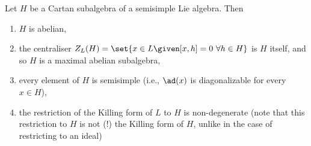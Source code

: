 Let $H$ be a Cartan subalgebra of a semisimple Lie algebra. Then
\begin{enumerate}[label=(\alph*)]
	\item $H$ is abelian,
	\item the centraliser $Z_L(H) = \set{x \in L\given [x, h] = 0~\forall h \in H}$
		is $H$ itself, and so $H$ is a maximal abelian subalgebra,
	\item every element of $H$ is semisimple (i.e., $\ad(x)$ is diagonalizable for
		every $x \in H$),
	\item the restriction of the Killing form of $L$ to $H$ is non-degenerate
		(note that this restriction to $H$ is not (!) the Killing form of $H$, unlike
		in the case of restricting to an ideal)
\end{enumerate}
